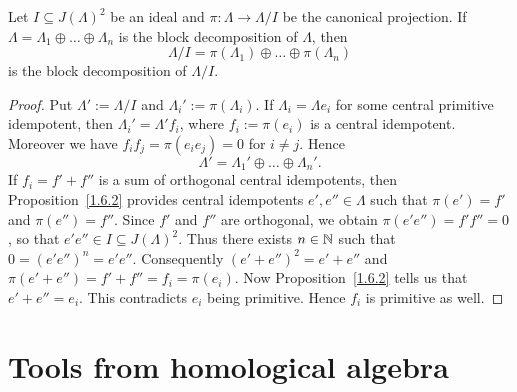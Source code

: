 %




\begin{corollary}\label{1.6.3}
Let $I\subseteq J(\Lambda)^2$ be an ideal and $\pi:\Lambda\to\Lambda/I$ be the canonical projection. If $\Lambda=\Lambda_1\oplus\dots\oplus\Lambda_n$ is the block decomposition of $\Lambda$, then
\[
\Lambda/I=\pi(\Lambda_1)\oplus\dots\oplus\pi(\Lambda_n)
\]
is the block decomposition of $\Lambda/I$.
\end{corollary}


\begin{proof}
Put $\Lambda':=\Lambda/I$ and $\Lambda_i':=\pi(\Lambda_i)$. If $\Lambda_i=\Lambda e_i$ for some central primitive idempotent, then $\Lambda_i'=\Lambda' f_i$, where $f_i:=\pi(e_i)$ is a central idempotent. Moreover we have $f_if_j=\pi(e_ie_j)=0$ for $i\neq j$. Hence
\[
\Lambda' = \Lambda_1' \oplus\dots\oplus \Lambda_n'.
\]
If $f_i=f'+f''$ is a sum of orthogonal central idempotents, then Proposition~\ref{1.6.2} provides central idempotents $e',e''\in\Lambda$ such that $\pi(e')=f'$ and $\pi(e'')=f''$. Since $f'$ and $f''$ are orthogonal, we obtain $\pi(e'e'')=f'f''=0$, so that $e'e''\in I\subseteq J(\Lambda)^2$. Thus there exists $n\in\mathbb{N}$ such that $0=(e'e'')^n=e'e''$. Consequently $(e'+e'')^2=e'+e''$ and $\pi(e'+e'')=f'+f''=f_i=\pi(e_i)$. Now Proposition~\ref{1.6.2} tells us that $e'+e''=e_i$. This contradicts $e_i$ being primitive. Hence $f_i$ is primitive as well.
\end{proof}



\chapter{Tools from homological algebra}

